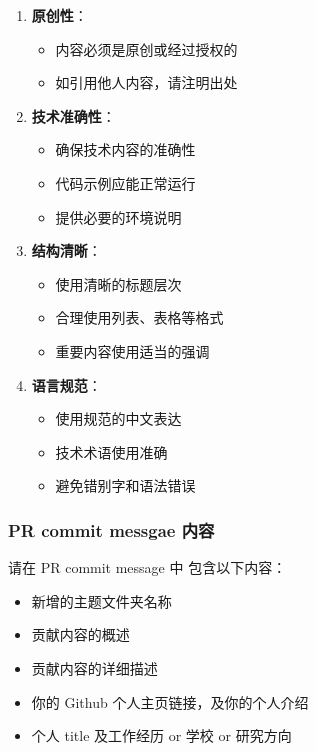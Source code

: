 \documentclass[
]{article}
\providecommand{\tightlist}{%
  \setlength{\itemsep}{0pt}\setlength{\parskip}{0pt}}
\begin{document}
\begin{enumerate}
\def\labelenumi{\arabic{enumi}.}
\tightlist
\item
  \textbf{原创性}：

  \begin{itemize}
  \tightlist
  \item
    内容必须是原创或经过授权的
  \item
    如引用他人内容，请注明出处
  \end{itemize}
\item
  \textbf{技术准确性}：

  \begin{itemize}
  \tightlist
  \item
    确保技术内容的准确性
  \item
    代码示例应能正常运行
  \item
    提供必要的环境说明
  \end{itemize}
\item
  \textbf{结构清晰}：

  \begin{itemize}
  \tightlist
  \item
    使用清晰的标题层次
  \item
    合理使用列表、表格等格式
  \item
    重要内容使用适当的强调
  \end{itemize}
\item
  \textbf{语言规范}：

  \begin{itemize}
  \tightlist
  \item
    使用规范的中文表达
  \item
    技术术语使用准确
  \item
    避免错别字和语法错误
  \end{itemize}
\end{enumerate}

\subsubsection{PR commit messgae
内容}\label{pr-commit-messgae-ux5185ux5bb9}

请在 PR commit message 中 包含以下内容：

\begin{itemize}
\tightlist
\item
  新增的主题文件夹名称
\item
  贡献内容的概述
\item
  贡献内容的详细描述
\item
  你的 Github 个人主页链接，及你的个人介绍
\item
  个人 title 及工作经历 or 学校 or 研究方向
\end{itemize}
\end{document}
